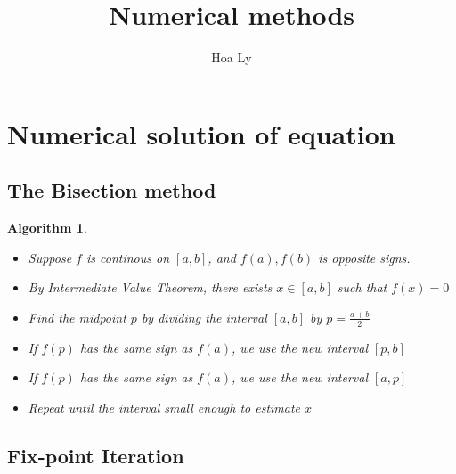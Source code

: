 \documentclass[12pt]{article}
\title{Numerical methods }
\author{Hoa Ly}
\newtheorem{alg}[theorem]{Algorithm}
\begin{document}
\maketitle
{}
\tableofcontents
\newpage


\section{Numerical solution of equation}
\subsection{The Bisection method}
\begin{alg}
\begin{itemize}
	\item Suppose $f$ is continous on $[a,b]$, and $f(a),f(b)$ is opposite signs.
	\item By Intermediate Value Theorem, there exists $x \in [a,b]$ such that $f(x) = 0$
	\item Find the midpoint $p$ by dividing the interval $[a,b]$ by $p = \frac{a+b}{2}$
	\item If $f(p)$ has the same sign as $f(a)$, we use the new interval $[p,b]$
	\item If $f(p)$ has the same sign as $f(a)$, we use the new interval $[a,p]$
	\item Repeat until the interval small enough to estimate $x$
	
\end{itemize}
\end{alg}


\subsection{Fix-point Iteration}
\end{document}
